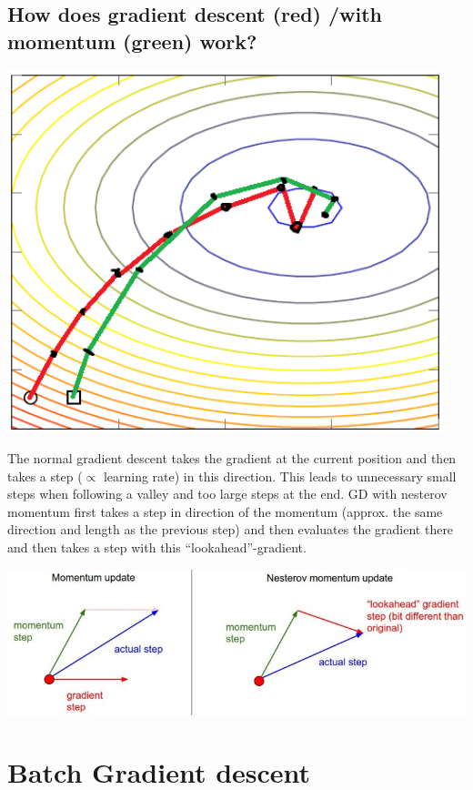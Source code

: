 \subsection{How does gradient descent (red) /with momentum (green) work? }
\begin{minipage}{0.4\textwidth}
\includegraphics[width=0.95\textwidth]{./img/gradient.PNG}
\end{minipage}\begin{minipage}{0.6\textwidth}The normal gradient descent takes the gradient at the current position and then takes a step ($\propto$ learning rate) in this direction. This leads to unnecessary small steps when following a valley and too large steps at the end. GD with nesterov momentum first takes a step in direction of the momentum (approx. the same direction and length as the previous step) and then evaluates the gradient there and then takes a step with this ``lookahead''-gradient.
\end{minipage}
\includegraphics[width=\textwidth]{./img/nesterov.jpeg}
%
\section{Batch Gradient descent}

